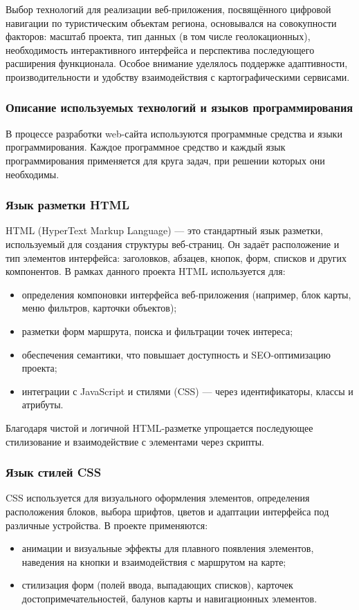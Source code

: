 Выбор технологий для реализации веб-приложения, посвящённого цифровой навигации по туристическим объектам региона, основывался на совокупности факторов: масштаб проекта, тип данных (в том числе геолокационных), необходимость интерактивного интерфейса и перспектива последующего расширения функционала. Особое внимание уделялось поддержке адаптивности, производительности и удобству взаимодействия с картографическими сервисами.

\subsubsection{Описание используемых технологий и языков программирования}

В процессе разработки web-сайта используются программные средства и языки программирования. Каждое программное средство и каждый язык программирования применяется для круга задач, при решении которых они необходимы.

\subsubsection{Язык разметки HTML}

HTML (HyperText Markup Language) — это стандартный язык разметки\cite{b19}, используемый для создания структуры веб-страниц. Он задаёт расположение и тип элементов интерфейса: заголовков, абзацев, кнопок, форм, списков и других компонентов. В рамках данного проекта HTML используется для:
\begin{itemize}
	\item определения компоновки интерфейса веб-приложения (например, блок карты, меню фильтров, карточки объектов);
	\item разметки форм маршрута, поиска и фильтрации точек интереса;
	\item обеспечения семантики, что повышает доступность и SEO-оптимизацию проекта;
	\item интеграции с JavaScript и стилями (CSS) — через идентификаторы, классы и атрибуты.
\end{itemize}

Благодаря чистой и логичной HTML-разметке упрощается последующее стилизование и взаимодействие с элементами через скрипты.

\subsubsection{Язык стилей CSS}

CSS используется для визуального оформления элементов, определения расположения блоков, выбора шрифтов, цветов и адаптации интерфейса под различные устройства. В проекте применяются:
\begin{itemize}
	\item анимации и визуальные эффекты для плавного появления элементов, наведения на кнопки и взаимодействия с маршрутом на карте;
	\item стилизация форм (полей ввода, выпадающих списков), карточек достопримечательностей, балунов карты и навигационных элементов.
\end{itemize}

